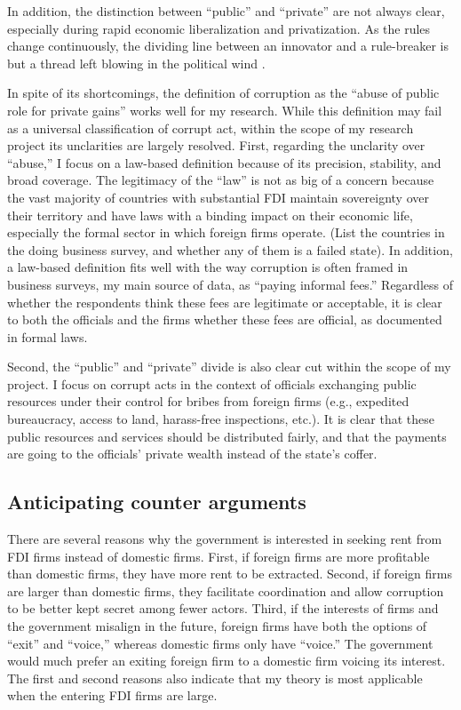 In addition, the distinction between ``public'' and ``private'' are not always clear, especially during rapid economic liberalization and privatization. As the rules change continuously, the dividing line between an innovator and a rule-breaker is but a thread left blowing in the political wind \citep{Sun2004}.

In spite of its shortcomings, the definition of corruption as the ``abuse of public role for private gains'' works well for my research. While this definition may fail as a universal classification of corrupt act, within the scope of my research project its unclarities are largely resolved. First, regarding the unclarity over ``abuse,'' I focus on a law-based definition because of its precision, stability, and broad coverage. The legitimacy of the ``law'' is not as big of a concern because the vast majority of countries with substantial FDI maintain sovereignty over their territory and have laws with a binding impact on their economic life, especially the formal sector in which foreign firms operate. (List the countries in the doing business survey, and whether any of them is a failed state). In addition, a law-based definition fits well with the way corruption is often framed in business surveys, my main source of data, as ``paying informal fees.'' Regardless of whether the respondents think these fees are legitimate or acceptable, it is clear to both the officials and the firms whether these fees are official, as documented in formal laws.

Second, the ``public'' and ``private'' divide is also clear cut within the scope of my project. I focus on corrupt acts in the context of officials exchanging public resources under their control for bribes from foreign firms (e.g., expedited bureaucracy, access to land, harass-free inspections, etc.). It is clear that these public resources and services should be distributed fairly, and that the payments are going to the officials' private wealth instead of the state's coffer.

\subsection{Anticipating counter arguments}

There are several reasons why the government is interested in seeking rent from FDI firms instead of domestic firms. First, if foreign firms are more profitable than domestic firms, they have more rent to be extracted. Second, if foreign firms are larger than domestic firms, they facilitate coordination and allow corruption to be better kept secret among fewer actors. Third, if the interests of firms and the government misalign in the future, foreign firms have both the options of ``exit'' and ``voice,'' whereas domestic firms only have ``voice.'' The government would much prefer an exiting foreign firm to a domestic firm voicing its interest. The first and second reasons also indicate that my theory is most applicable when the entering FDI firms are large.